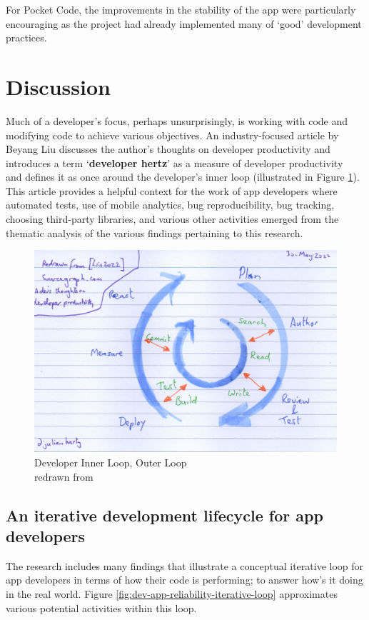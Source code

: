 For Pocket Code, the improvements in the stability of the app were particularly encouraging as the project had already implemented many of `good' development practices.


\section{Discussion}\label{apps-and-artefacts-discussion-section}
Much of a developer's focus, perhaps unsurprisingly, is working with code and modifying code to achieve various objectives. An industry-focused article by Beyang Liu discusses the author's thoughts on developer productivity and introduces a term `\textbf{developer hertz}' as a measure of developer productivity~\citep{liu2022_a_devs_thoughts_onDeveloper_productivity} and defines it as once around the developer's inner loop (illustrated in Figure \ref{fig:developer-inner-loop-outer-loop}). This article provides a helpful context for the work of app developers where automated tests, use of mobile analytics, bug reproducibility, bug tracking, choosing third-party libraries, and various other activities emerged from the thematic analysis of the various findings pertaining to this research.

\begin{figure}
    \centering
    \includegraphics[width=12cm]{images/rough-sketches/developer-inner-loop-outer-loop.jpeg}
    \caption{Developer Inner Loop, Outer Loop\\ redrawn from \citep{liu2022_a_devs_thoughts_onDeveloper_productivity}}
    \label{fig:developer-inner-loop-outer-loop}
\end{figure}

\subsection{An iterative development lifecycle for app developers}
The research includes many findings that illustrate a conceptual iterative loop for app developers in terms of how their code is performing; to answer how's it doing in the real world. Figure \ref{fig:dev-app-reliability-iterative-loop} approximates various potential activities within this loop.

